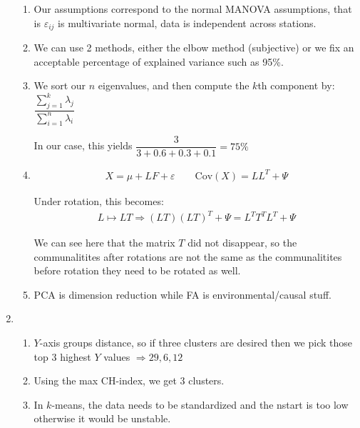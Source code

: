 \begin{enumerate}[label=\arabic*., leftmargin=*]
\begin{enumerate}[label=\alph*),leftmargin=*]
  \item Our assumptions correspond to the normal MANOVA assumptions, that is $\varepsilon_{ij}$ is multivariate normal, data is independent across stations.
    \par\bigskip
  \item We can use 2 methods, either the elbow method (subjective) or we fix an acceptable percentage of explained variance such as 95\%.
    \par\bigskip
  \item We sort our $n$ eigenvalues, and then compute the $k$th component by: $\dfrac{\sum_{j=1}^{k}\lambda_j}{\sum_{i=1}^{n}\lambda_i}$\par
    \noindent In our case, this yields $\dfrac{3}{3+0.6+0.3+0.1} = 75\%$
    \par\bigskip
  \item
    \begin{equation*}
      \begin{gathered}
        X = \mu+LF+\varepsilon\qquad \text{Cov}\left(X\right) = LL^T+\Psi
      \end{gathered}
    \end{equation*}
    \par\bigskip
    \noindent Under rotation, this becomes:
    \begin{equation*}
      \begin{gathered}
        L\mapsto LT
        \Rightarrow (LT)(LT)^T+\Psi = L^TT^TL^T+\Psi
      \end{gathered}
    \end{equation*}
    \par\bigskip
    \noindent We can see here that the matrix $T$ did not disappear, so the communalitites after rotations are not the same as the communalitites before rotation they need to be rotated as well. 
    \par\bigskip
  \item PCA is dimension reduction while FA is environmental/causal stuff.
  \end{enumerate}
  \par\bigskip
  \item 
  \begin{enumerate}[label=\alph*),leftmargin=*]
    \item $Y$-axis groups distance, so if three clusters are desired then we pick those top 3 highest $Y$ values $\Rightarrow 29,6,12$
      \par\bigskip
    \item Using the max CH-index, we get 3 clusters.
      \par\bigskip
    \item In $k$-means, the data needs to be standardized and the nstart is too low otherwise it would be unstable.
  \end{enumerate}
\end{enumerate}
